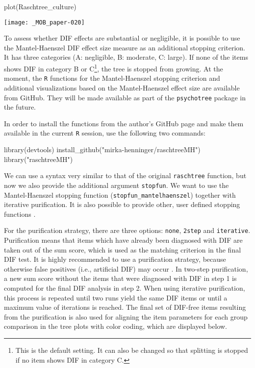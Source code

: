 \documentclass[doc,floatsintext,natbib]{apa7}
\begin{document}
\begin{Schunk}
\begin{Sinput}
 plot(Raschtree_culture)
\end{Sinput}
\end{Schunk}
\texttt{[image: \_MOB\_paper-020]}

To assess whether DIF effects are substantial or negligible, it is possible to use the Mantel-Haenszel DIF effect size measure as an additional stopping criterion. It has three categories (A: negligible, B: moderate, C: large). If none of the items shows DIF in category B or C\footnote{This is the default setting. It can also be changed so that splitting is stopped if no item shows DIF in category C.}, the tree is stopped from growing.
At the moment, the \texttt{R} functions for the Mantel-Haenszel stopping criterion and additional visualizations based on the Mantel-Haenszel effect size are available from GitHub. They will be made available as part of the \texttt{psychotree} package in the future.

In order to install the functions from the author's GitHub page and make them available in the current \texttt{R} session, use the following two commands:

\begin{Schunk}
\begin{Sinput}
 library(devtools)
 install_github("mirka-henninger/raschtreeMH")
 library("raschtreeMH")
\end{Sinput}
\end{Schunk}

We can use a syntax very similar to that of the original \texttt{raschtree} function, but now we also provide the additional argument \texttt{stopfun}. We want to use the Mantel-Haenszel stopping function (\texttt{stopfun\_mantelhaenszel}) together with iterative purification. It is also possible to provide other, user defined stopping functions \citep[see][for details]{HennyDeba23}.

For the purification strategy, there are three options: \texttt{none}, \texttt{2step} and \texttt{iterative}. Purification means that items which have already been diagnosed with DIF are taken out of the sum score, which is used as the matching criterion in the final DIF test. It is highly recommended to use a purification strategy, because otherwise false positives (i.e., artificial DIF) may occur \citep[cf., e.g.,][and the references therein]{DebStrZei:2022:CRC,HennyDeba23,Kopfetal:2015:EPM}. In two-step purification, a new sum score without the items that were diagnosed with DIF in step 1 is computed for the final DIF analysis in step 2. When using iterative purification, this process is repeated until two runs yield the same DIF items or until a maximum value of iterations is reached. 
The final set of DIF-free items resulting from the purification is also used for aligning the item parameters for each group comparison in the tree plots with color coding, which are displayed below.
\end{document}
